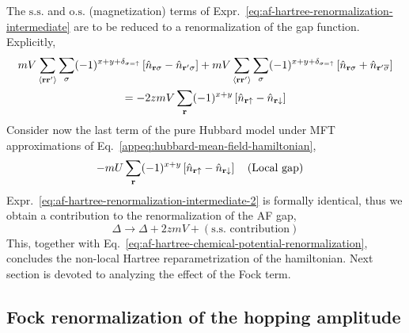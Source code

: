The $\mathrm{s.s.}$ and $\mathrm{o.s.}$ (magnetization) terms of Expr.~\eqref{eq:af-hartree-renormalization-intermediate} are to be reduced to a renormalization of the gap function. Explicitly,
\begin{multline}
	mV \sum_{\ev{\mathbf{r}\mathbf{r}'}} \sum_\sigma (-1)^{x+y+\delta_{\sigma=\uparrow}} \left[
		\hat n_{\mathbf{r}\sigma} - \hat n_{\mathbf{r}'\sigma}
	\right] + mV \sum_{\ev{\mathbf{r}\mathbf{r}'}} \sum_\sigma (-1)^{x+y+\delta_{\sigma=\uparrow}} \left[
		\hat n_{\mathbf{r}\sigma} + \hat n_{\mathbf{r}'\overline{\sigma}}
	\right] \\
	= -2zmV \sum_\mathbf{r} (-1)^{x+y} \left[
		\hat n_{\mathbf{r}\uparrow} - \hat n_{\mathbf{r}\downarrow}
	\right] \label{eq:af-hartree-renormalization-intermediate-2}
\end{multline}
Consider now the last term of the pure Hubbard model under MFT approximations of Eq.~\eqref{appeq:hubbard-mean-field-hamiltonian},
\[
	- mU \sum_\mathbf{r} (-1)^{x+y} \left[
		\hat n_{\mathbf{r}\uparrow} - \hat n_{\mathbf{r}\downarrow}
	\right]
	\qq{(Local gap)}
\]
Expr.~\eqref{eq:af-hartree-renormalization-intermediate-2} is formally identical, thus we obtain a contribution to the renormalization of the AF gap,
\begin{equation}\label{eq:af-hartree-gap-os-renormalization}
	\Delta \to \Delta + 2zmV + (\text{s.s. contribution})
\end{equation}
This, together with Eq.~\eqref{eq:af-hartree-chemical-potential-renormalization}, concludes the non-local Hartree reparametrization of the hamiltonian. Next section is devoted to analyzing the effect of the Fock term.

\subsection{Fock renormalization of the hopping amplitude}\label{subsec:fock-renormalization-hopping-amplitude}

